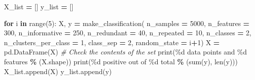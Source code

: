 \documentclass[
  11pt,
  oneside]{book}
\newenvironment{Shaded}{\begin{snugshade}}{\end{snugshade}}
\newcommand{\BuiltInTok}[1]{#1}
\newcommand{\CommentTok}[1]{\textcolor[rgb]{0.56,0.35,0.01}{\textit{#1}}}
\newcommand{\ControlFlowTok}[1]{\textcolor[rgb]{0.13,0.29,0.53}{\textbf{#1}}}
\newcommand{\DecValTok}[1]{\textcolor[rgb]{0.00,0.00,0.81}{#1}}
\newcommand{\KeywordTok}[1]{\textcolor[rgb]{0.13,0.29,0.53}{\textbf{#1}}}
\newcommand{\NormalTok}[1]{#1}
\newcommand{\OperatorTok}[1]{\textcolor[rgb]{0.81,0.36,0.00}{\textbf{#1}}}
\newcommand{\SpecialCharTok}[1]{\textcolor[rgb]{0.00,0.00,0.00}{#1}}
\newcommand{\StringTok}[1]{\textcolor[rgb]{0.31,0.60,0.02}{#1}}
\begin{document}
\begin{Shaded}
\begin{Highlighting}[]
\NormalTok{X\_list }\OperatorTok{=}\NormalTok{ []}
\NormalTok{y\_list }\OperatorTok{=}\NormalTok{ []}

\ControlFlowTok{for}\NormalTok{ i }\KeywordTok{in} \BuiltInTok{range}\NormalTok{(}\DecValTok{5}\NormalTok{):}
\NormalTok{    X, y }\OperatorTok{=}\NormalTok{ make\_classification(}
\NormalTok{        n\_samples }\OperatorTok{=} \DecValTok{5000}\NormalTok{, }
\NormalTok{        n\_features }\OperatorTok{=} \DecValTok{300}\NormalTok{, }
\NormalTok{        n\_informative }\OperatorTok{=} \DecValTok{250}\NormalTok{, }
\NormalTok{        n\_redundant }\OperatorTok{=} \DecValTok{40}\NormalTok{, }
\NormalTok{        n\_repeated }\OperatorTok{=} \DecValTok{10}\NormalTok{, }
\NormalTok{        n\_classes }\OperatorTok{=} \DecValTok{2}\NormalTok{, }
\NormalTok{        n\_clusters\_per\_class }\OperatorTok{=} \DecValTok{1}\NormalTok{, }
\NormalTok{        class\_sep }\OperatorTok{=} \DecValTok{2}\NormalTok{, }
\NormalTok{        random\_state }\OperatorTok{=}\NormalTok{ i}\OperatorTok{+}\DecValTok{1}\NormalTok{)}
\NormalTok{    X }\OperatorTok{=}\NormalTok{ pd.DataFrame(X)}
    \CommentTok{\# Check the contents of the set}
    \BuiltInTok{print}\NormalTok{(}\StringTok{\textquotesingle{}}\SpecialCharTok{\%d}\StringTok{ data points and }\SpecialCharTok{\%d}\StringTok{ features\textquotesingle{}} \OperatorTok{\%}\NormalTok{ (X.shape))}
    \BuiltInTok{print}\NormalTok{(}\StringTok{\textquotesingle{}}\SpecialCharTok{\%d}\StringTok{ positive out of }\SpecialCharTok{\%d}\StringTok{ total\textquotesingle{}} \OperatorTok{\%}\NormalTok{ (}\BuiltInTok{sum}\NormalTok{(y), }\BuiltInTok{len}\NormalTok{(y)))}
\NormalTok{    X\_list.append(X)}
\NormalTok{    y\_list.append(y)}
\end{Highlighting}
\end{Shaded}
\end{document}
